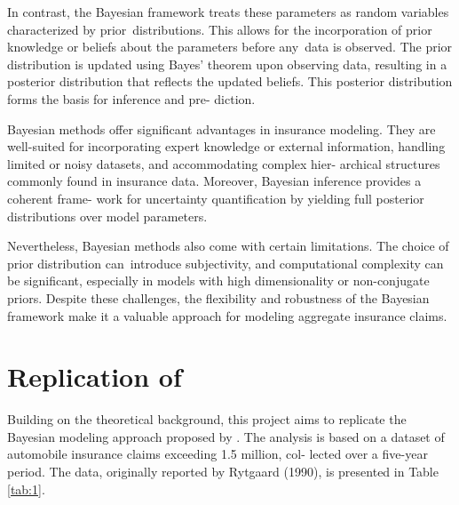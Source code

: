 \documentclass{Class/julia}
\begin{document}
In contrast, the Bayesian framework treats these parameters as random variables characterized by prior~distributions. This allows for the incorporation of prior knowledge or beliefs about the parameters before any~data is observed. The prior distribution is updated using Bayes' theorem upon observing data, resulting in a posterior distribution that reflects the updated beliefs. This posterior distribution forms the basis for inference and pre- diction.

Bayesian methods offer significant advantages in insurance modeling. They are well-suited for incorporating expert knowledge or external information, handling limited or noisy datasets, and accommodating complex hier- archical structures commonly found in insurance data. Moreover, Bayesian inference provides a coherent frame- work for uncertainty quantification by yielding full posterior distributions over model parameters.

Nevertheless, Bayesian methods also come with certain limitations. The choice of prior distribution can~introduce subjectivity, and computational complexity can be significant, especially in models with high dimensionality or non-conjugate priors. Despite these challenges, the flexibility and robustness of the Bayesian framework make it a valuable approach for modeling aggregate insurance claims.

\section{Replication of \citet{dudley2006bayesian}}

Building on the theoretical background, this project aims to replicate the Bayesian modeling approach proposed by \citet{dudley2006bayesian}. The analysis is based on a dataset of automobile insurance claims exceeding 1.5 million, col- lected over a five-year period. The data, originally reported by Rytgaard (1990), is presented in Table \ref{tab:1}.
\end{document}

